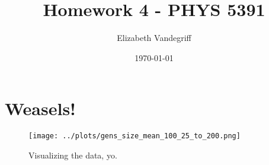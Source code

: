 \documentclass[12pt, letterpaper]{article}
\begin{document}
\title{Homework 4 - PHYS 5391}
\author{Elizabeth Vandegriff}
\date{\today}

\maketitle
\newpage
\tableofcontents
\newpage

\section{Weasels!}


\begin{figure}[!ht]
  \centering
  \texttt{[image: ../plots/gens\_size\_mean\_100\_25\_to\_200.png]}
  \caption{Visualizing the data, yo.}
  \label{fig:vargen}
\end{figure}
\end{document}
